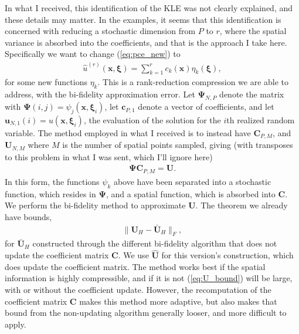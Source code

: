 \documentclass{report}
\begin{document}
In what I received, this identification of the KLE was not clearly explained, and these details may matter. In the examples, it seems that this identification is concerned with reducing a stochastic dimension from $P$ to $r$, where the spatial variance is absorbed into the coefficients, and that is the approach I take here. Specifically we want to change (\ref{eq:pce_new}) to
\begin{align}
\label{eq:pce_compressed}
\hat{u}^{(r)}(\bm{x},\bm{\xi}) = \mathop{\sum}\limits_{k=1}^{r}c_k(\bm{x})\eta_k(\bm{\xi}),
\end{align}
for some new functions $\eta_k$. This is a rank-reduction compression we are able to address, with the bi-fidelity approximation error. Let $\bm{\Psi}_{N,P}$ denote the matrix with $\bm{\Psi}(i,j) = \psi_j(\bm{x},\bm{\xi}_i)$, let $\bm{c}_{P,1}$ denote a vector of coefficients, and let $\bm{u}_{N,1}(i) = u(\bm{x},\bm{\xi}_i)$, the evaluation of the solution for the $i$th realized random variable. The method employed in what I received is to instead have $\bm{C}_{P,M}$, and $\bm{U}_{N,M}$ where $M$ is the number of spatial points sampled, giving (with transposes to this problem in what I was sent, which I'll ignore here)
\begin{align}
\label{eq:mat_original}
\bm{\Psi}\bm{C}_{P,M} = \bm{U}.
\end{align}
 In this form, the functions $\psi_k$ above have been separated into a stochastic function, which resides in $\bm{\Psi}$, and a spatial function, which is absorbed into $\bm{C}$.\\
 
We perform the bi-fidelity method to approximate $\bm{U}$. The theorem we already have bounds,
\begin{align}
\label{eq:U_bound}
\|\bm{U}_H - \bar{\bm{U}}_H\|_F,
\end{align}
for $\bar{\bm{U}}_H$ constructed through the different bi-fidelity algorithm that does not update the coefficient matrix $\bm{C}$. We use $\hat{\bm{U}}$ for this version's construction, which does update the coefficient matrix. The method works best if the spatial information is highly compressible, and if it is not (\ref{eq:U_bound}) will be large, with or without the coefficient update. However, the recomputation of the coefficient matrix $\bm{C}$ makes this method more adaptive, but also makes that bound from the non-updating algorithm generally looser, and more difficult to apply.\\
\end{document}
